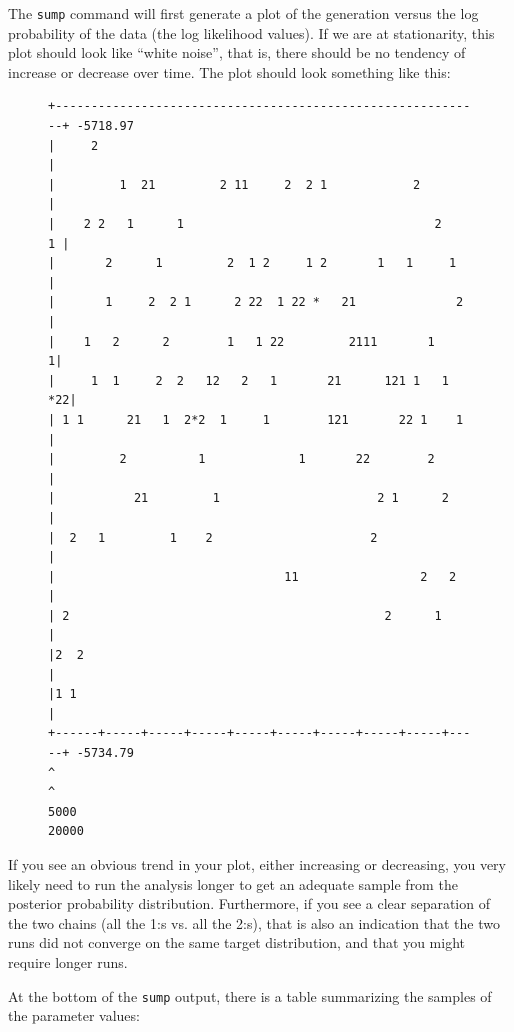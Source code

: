 \documentclass[12pt]{book}
\begin{document}
The \texttt{sump} command will first generate a plot of the generation versus the log probability
of the data (the log likelihood values). If we are at stationarity, this plot should look like
``white noise'', that is, there should be no tendency of increase or decrease over time. The plot
should look something like this:

\begin{figure}[h]
\centering
\begin{BVerbatim}[fontsize=\scriptsize]
+------------------------------------------------------------+ -5718.97
|     2                                                      |
|         1  21         2 11     2  2 1            2         |
|    2 2   1      1                                   2    1 |
|       2      1         2  1 2     1 2       1   1     1    |
|       1     2  2 1      2 22  1 22 *   21              2   |
|    1   2      2        1   1 22         2111       1      1|
|     1  1     2  2   12   2   1       21      121 1   1  *22|
| 1 1      21   1  2*2  1     1        121       22 1    1   |
|         2          1             1       22        2       |
|           21         1                      2 1      2     |
|  2   1         1    2                      2               |
|                                11                 2   2    |
| 2                                            2      1      |
|2  2                                                        |
|1 1                                                         |
+------+-----+-----+-----+-----+-----+-----+-----+-----+-----+ -5734.79
^                                                            ^
5000                                                         20000
\end{BVerbatim}
\end{figure}

If you see an obvious trend in your plot, either increasing or decreasing, you very likely need to
run the analysis longer to get an adequate sample from the posterior probability distribution.
Furthermore, if you see a clear separation of the two chains (all the 1:s vs. all the 2:s), that is
also an indication that the two runs did not converge on the same target distribution, and that you
might require longer runs.

At the bottom of the \texttt{sump} output, there is a table summarizing the samples of the
parameter values:
\end{document}
